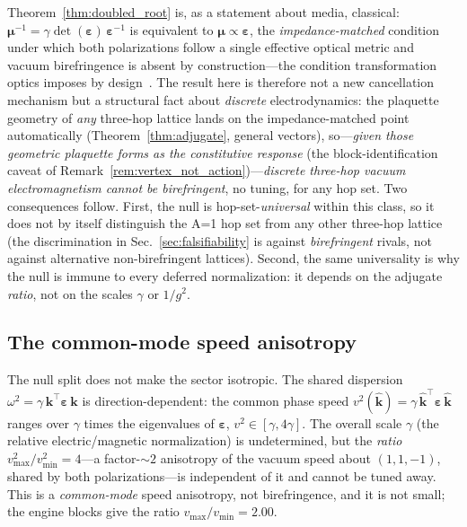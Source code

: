 \begin{remark}
\label{rem:impedance_novelty}
Theorem~\ref{thm:doubled_root} is, as a statement about media, classical: $\boldsymbol{\mu}^{-1}
= \gamma\det(\boldsymbol{\varepsilon})\,\boldsymbol{\varepsilon}^{-1}$ is equivalent to
$\boldsymbol{\mu}\propto\boldsymbol{\varepsilon}$, the \emph{impedance-matched} condition
under which both polarizations follow a single effective optical metric and vacuum
birefringence is absent by construction---the condition transformation optics imposes by
design~\cite{plebanski1960,pendry2006,leonhardt2006}. The result here is therefore not a new
cancellation mechanism but a structural fact about \emph{discrete} electrodynamics: the
plaquette geometry of \emph{any} three-hop lattice lands on the impedance-matched point
automatically (Theorem~\ref{thm:adjugate}, general vectors), so---\emph{given those
geometric plaquette forms as the constitutive response} (the block-identification caveat of
Remark~\ref{rem:vertex_not_action})---\emph{discrete three-hop vacuum electromagnetism
cannot be birefringent}, no tuning, for any hop set. Two
consequences follow. First, the null is hop-set-\emph{universal} within this class, so it
does not by itself distinguish the A=1 hop set from any other three-hop lattice (the
discrimination in Sec.~\ref{sec:falsifiability} is against \emph{birefringent} rivals, not
against alternative non-birefringent lattices). Second, the same universality is why the
null is immune to every deferred normalization: it depends on the adjugate \emph{ratio}, not
on the scales $\gamma$ or $1/g^2$.
\end{remark}

\subsection{The common-mode speed anisotropy}
\label{subsec:common_mode}

The null split does not make the sector isotropic. The shared dispersion
$\omega^2 = \gamma\,\mathbf{k}^{\!\top}\boldsymbol{\varepsilon}\,\mathbf{k}$ is
direction-dependent: the common phase speed $v^2(\hat{\mathbf{k}}) =
\gamma\,\hat{\mathbf{k}}^{\!\top}\boldsymbol{\varepsilon}\,\hat{\mathbf{k}}$ ranges over
$\gamma$ times the eigenvalues of $\boldsymbol{\varepsilon}$, $v^2\in[\gamma,4\gamma]$.
The overall scale $\gamma$ (the relative electric/magnetic normalization) is
undetermined, but the \emph{ratio} $v^2_{\max}/v^2_{\min} = 4$---a factor-$\sim2$
anisotropy of the vacuum speed about $(1,1,-1)$, shared by both polarizations---is
independent of it and cannot be tuned away. This is a \emph{common-mode} speed
anisotropy, not birefringence, and it is not small; the engine blocks give the ratio
$v_{\max}/v_{\min}=2.00$.

